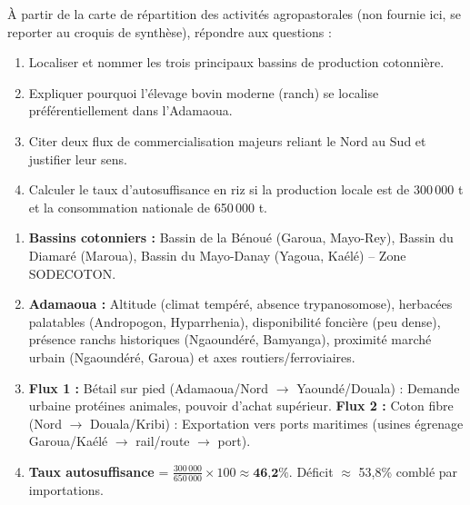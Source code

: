 \documentclass[11pt]{article}
\begin{document}
\begin{exercice}
À partir de la carte de répartition des activités agropastorales (non fournie ici, se reporter au croquis de synthèse), répondre aux questions :
\begin{enumerate}
    \item Localiser et nommer les trois principaux bassins de production cotonnière.
    \item Expliquer pourquoi l'élevage bovin moderne (ranch) se localise préférentiellement dans l'Adamaoua.
    \item Citer deux flux de commercialisation majeurs reliant le Nord au Sud et justifier leur sens.
    \item Calculer le taux d'autosuffisance en riz si la production locale est de 300\,000 t et la consommation nationale de 650\,000 t.
\end{enumerate}
\end{exercice}

\begin{corrige}[Exercice 1]
\begin{enumerate}
    \item \textbf{Bassins cotonniers :} Bassin de la Bénoué (Garoua, Mayo-Rey), Bassin du Diamaré (Maroua), Bassin du Mayo-Danay (Yagoua, Kaélé) -- Zone SODECOTON.
    \item \textbf{Adamaoua :} Altitude (climat tempéré, absence trypanosomose), herbacées palatables (Andropogon, Hyparrhenia), disponibilité foncière (peu dense), présence ranchs historiques (Ngaoundéré, Bamyanga), proximité marché urbain (Ngaoundéré, Garoua) et axes routiers/ferroviaires.
    \item \textbf{Flux 1 :} Bétail sur pied (Adamaoua/Nord $\to$ Yaoundé/Douala) : Demande urbaine protéines animales, pouvoir d'achat supérieur. \textbf{Flux 2 :} Coton fibre (Nord $\to$ Douala/Kribi) : Exportation vers ports maritimes (usines égrenage Garoua/Kaélé $\to$ rail/route $\to$ port).
    \item \textbf{Taux autosuffisance} = $\frac{300\,000}{650\,000} \times 100 \approx \textbf{46,2\%}$. Déficit $\approx$ 53,8\% comblé par importations.
\end{enumerate}
\end{corrige}
\end{document}
